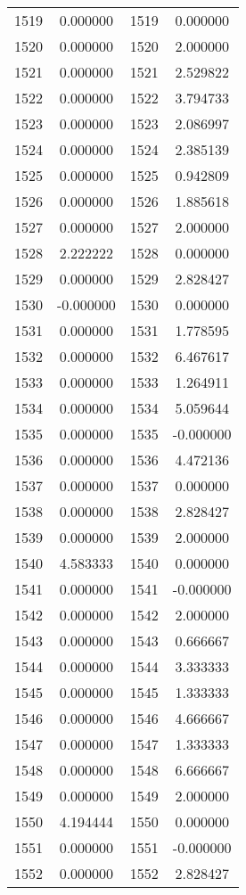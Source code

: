 \documentclass[12pt]{article}
\begin{document}
\begin{longtable}{@{}cccc@{}}
1519 & 0.000000 & 1519 & 0.000000 \\
1520 & 0.000000 & 1520 & 2.000000 \\
1521 & 0.000000 & 1521 & 2.529822 \\
1522 & 0.000000 & 1522 & 3.794733 \\
1523 & 0.000000 & 1523 & 2.086997 \\
1524 & 0.000000 & 1524 & 2.385139 \\
1525 & 0.000000 & 1525 & 0.942809 \\
1526 & 0.000000 & 1526 & 1.885618 \\
1527 & 0.000000 & 1527 & 2.000000 \\
1528 & 2.222222 & 1528 & 0.000000 \\
1529 & 0.000000 & 1529 & 2.828427 \\
1530 & -0.000000 & 1530 & 0.000000 \\
1531 & 0.000000 & 1531 & 1.778595 \\
1532 & 0.000000 & 1532 & 6.467617 \\
1533 & 0.000000 & 1533 & 1.264911 \\
1534 & 0.000000 & 1534 & 5.059644 \\
1535 & 0.000000 & 1535 & -0.000000 \\
1536 & 0.000000 & 1536 & 4.472136 \\
1537 & 0.000000 & 1537 & 0.000000 \\
1538 & 0.000000 & 1538 & 2.828427 \\
1539 & 0.000000 & 1539 & 2.000000 \\
1540 & 4.583333 & 1540 & 0.000000 \\
1541 & 0.000000 & 1541 & -0.000000 \\
1542 & 0.000000 & 1542 & 2.000000 \\
1543 & 0.000000 & 1543 & 0.666667 \\
1544 & 0.000000 & 1544 & 3.333333 \\
1545 & 0.000000 & 1545 & 1.333333 \\
1546 & 0.000000 & 1546 & 4.666667 \\
1547 & 0.000000 & 1547 & 1.333333 \\
1548 & 0.000000 & 1548 & 6.666667 \\
1549 & 0.000000 & 1549 & 2.000000 \\
1550 & 4.194444 & 1550 & 0.000000 \\
1551 & 0.000000 & 1551 & -0.000000 \\
1552 & 0.000000 & 1552 & 2.828427 \\

\end{longtable}
\end{document}
